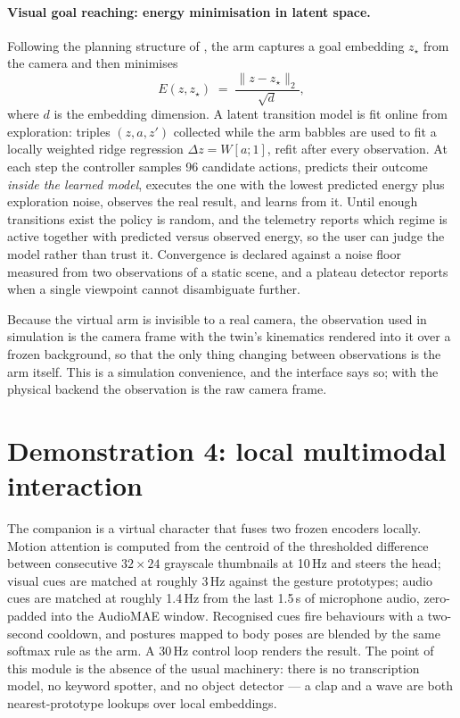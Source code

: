 \documentclass[11pt,onecolumn]{article}
\begin{document}
\paragraph{Visual goal reaching: energy minimisation in latent space.}
Following the planning structure of \cite{lewm2026}, the arm captures a goal embedding
$z_\star$ from the camera and then minimises
\begin{equation}
E(z, z_\star) \;=\; \frac{\lVert z - z_\star \rVert_2}{\sqrt{d}} ,
\end{equation}
where $d$ is the embedding dimension. A latent transition model is fit online from
exploration: triples $(z, a, z')$ collected while the arm babbles are used to fit a
locally weighted ridge regression $\Delta z = W[a;1]$, refit after every observation. At
each step the controller samples 96 candidate actions, predicts their outcome \emph{inside
the learned model}, executes the one with the lowest predicted energy plus exploration
noise, observes the real result, and learns from it. Until enough transitions exist the
policy is random, and the telemetry reports which regime is active together with predicted
versus observed energy, so the user can judge the model rather than trust it. Convergence
is declared against a noise floor measured from two observations of a static scene, and a
plateau detector reports when a single viewpoint cannot disambiguate further.

Because the virtual arm is invisible to a real camera, the observation used in simulation
is the camera frame with the twin's kinematics rendered into it over a frozen background,
so that the only thing changing between observations is the arm itself. This is a
simulation convenience, and the interface says so; with the physical backend the observation is
the raw camera frame.

\section{Demonstration 4: local multimodal interaction}
\label{sec:companion}

The companion is a virtual character that fuses two frozen encoders locally. Motion
attention is computed from the centroid of the thresholded difference between consecutive
$32\times24$ grayscale thumbnails at 10\,Hz and steers the head; visual cues are matched
at roughly 3\,Hz against the gesture prototypes; audio cues are matched at roughly
1.4\,Hz from the last 1.5\,s of microphone audio, zero-padded into the AudioMAE window.
Recognised cues fire behaviours with a two-second cooldown, and postures mapped to body
poses are blended by the same softmax rule as the arm. A 30\,Hz control loop renders the
result. The point of this module is the absence of the usual machinery: there is no
transcription model, no keyword spotter, and no object detector --- a clap and a wave are
both nearest-prototype lookups over local embeddings.
\end{document}
